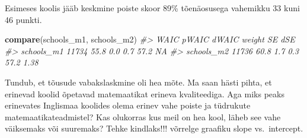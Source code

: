 \documentclass[]{book}
\newenvironment{Shaded}{\begin{snugshade}}{\end{snugshade}}
\newcommand{\CommentTok}[1]{\textcolor[rgb]{0.56,0.35,0.01}{\textit{#1}}}
\newcommand{\DataTypeTok}[1]{\textcolor[rgb]{0.13,0.29,0.53}{#1}}
\newcommand{\DecValTok}[1]{\textcolor[rgb]{0.00,0.00,0.81}{#1}}
\newcommand{\KeywordTok}[1]{\textcolor[rgb]{0.13,0.29,0.53}{\textbf{#1}}}
\newcommand{\NormalTok}[1]{#1}
\newcommand{\OperatorTok}[1]{\textcolor[rgb]{0.81,0.36,0.00}{\textbf{#1}}}
\newcommand{\StringTok}[1]{\textcolor[rgb]{0.31,0.60,0.02}{#1}}
\begin{document}
\begin{Shaded}
\end{Shaded}

Esimeses koolis jääb keskmine poiste skoor 89\% tõenäosusega vahemikku 33 kuni 46 punkti.

\begin{Shaded}
\begin{Highlighting}[]
\KeywordTok{compare}\NormalTok{(schools_m1, schools_m2)}
\CommentTok{#>             WAIC pWAIC dWAIC weight   SE  dSE}
\CommentTok{#> schools_m1 11734  55.8   0.0    0.7 57.2   NA}
\CommentTok{#> schools_m2 11736  60.8   1.7    0.3 57.2 1.38}
\end{Highlighting}
\end{Shaded}

Tundub, et tõusude vabakslaskmine oli hea mõte.
Ma saan hästi pihta, et erinevad koolid õpetavad matemaatikat erineva kvaliteediga.
Aga miks peaks erinevates Inglismaa koolides olema erinev vahe poiste ja tüdrukute matemaatikateadmistel?
Kas olukorras kus meil on hea kool, läheb see vahe väiksemaks või suuremaks?
Tehke kindlaks!!! võrrelge graafiku slope vs.~intercept.
\end{document}

